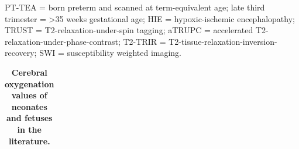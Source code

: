\documentclass[
true
]{sn-jnl}
\begin{document}
\begingroup\fontsize{9}{11}\selectfont

\begin{ThreePartTable}
\begin{TableNotes}[para]
\item PT-TEA = born preterm and scanned at term-equivalent age; late third trimester = >35 weeks gestational age; HIE = hypoxic-ischemic encephalopathy; TRUST = T2-relaxation-under-spin tagging; aTRUPC = accelerated T2-relaxation-under-phase-contrast; T2-TRIR = T2-tissue-relaxation-inversion-recovery; SWI = susceptibility weighted imaging.
\end{TableNotes}

\begin{longtable}[t]{ccllr}

\caption{\label{tbl-litvalues}\textbf{Cerebral oxygenation values of
neonates and fetuses in the literature.}}

\tabularnewline


\end{longtable}
\end{ThreePartTable}
\end{document}
